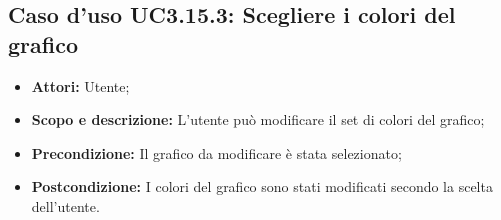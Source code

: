 \subsection{Caso d'uso UC3.15.3: Scegliere i colori del grafico}
\begin{itemize}
	\item \textbf{Attori:} Utente;
	\item \textbf{Scopo e descrizione:} L'utente può modificare il set di colori del grafico;
	\item \textbf{Precondizione:} Il grafico da modificare è stata selezionato;
	\item \textbf{Postcondizione:} I colori del grafico sono stati modificati secondo la scelta dell'utente.
\end{itemize}